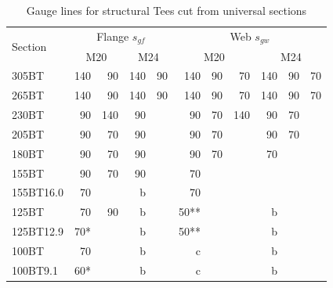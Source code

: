 \begin{table}[H]
\centering\footnotesize
\caption{Gauge lines for structural Tees cut from universal sections}\label{tab:tee_gauge}
\begin{minipage}{.8\linewidth}\centering
\begin{tabular}{l|rr|rr|rrr|rrr}
	\toprule
	\multirow{2}[0]{*}{Section} &        \multicolumn{4}{c|}{Flange $s_{gf}$}         &          \multicolumn{6}{c}{Web $s_{gw}$}          \\
	                            & \multicolumn{2}{c|}{M20} & \multicolumn{2}{c|}{M24} & \multicolumn{3}{c|}{M20} & \multicolumn{3}{c}{M24} \\ \midrule
	305BT                       &  140 &                90 & 140 &                 90 &  140 & 90 &           70 & 140 & 90 &           70 \\
	265BT                       &  140 &                90 & 140 &                 90 &  140 & 90 &           70 & 140 & 90 &           70 \\
	230BT                       &   90 &               140 &  90 &                    &   90 & 70 &          140 &  90 & 70 &              \\
	205BT                       &   90 &                70 &  90 &                    &   90 & 70 &              &  90 & 70 &              \\
	180BT                       &   90 &                70 &  90 &                    &   90 & 70 &              &  70 &    &              \\
	155BT                       &   90 &                70 &  90 &                    &   70 &    &              &     &    &              \\
	155BT16.0                   &   70 &                   &   b &                    &   70 &    &              &     &    &              \\
	125BT                       &   70 &                90 &   b &                    & 50** &    &              &   b &    &              \\
	125BT12.9                   &  70* &                   &   b &                    & 50** &    &              &   b &    &              \\
	100BT                       &   70 &                   &   b &                    &    c &    &              &   b &    &              \\
	100BT9.1                    &  60* &                   &   b &                    &    c &    &              &   b &    &              \\

\end{tabular}
\end{minipage}
\end{table}
